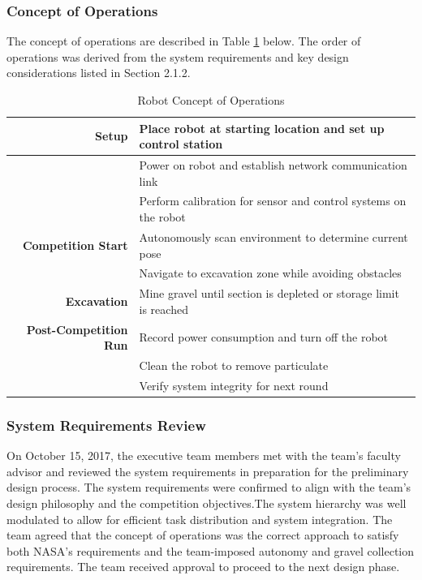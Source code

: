 \documentclass[class=article, crop=false]{standalone}
\begin{document}
	\subsubsection{Concept of Operations}
	The concept of operations are described in Table \ref{table:con_ops} below. The order of operations was derived from the system requirements and key design considerations listed in Section 2.1.2.
	
	\FloatBarrier
	\begin{table}[h]
	\centering
	\begin{tabular}{ | r | l |} 
 	\hline
 		\textbf{Setup}                & 
 		                                Place robot at starting location and set up control station \\ 
 		\hline
 		                              & Power on robot and establish network communication link \\
 		\hline
 		                              & Perform calibration for sensor and control systems on the robot \\
 		\hline\hline
 		\textbf{Competition Start}    & 
 		                                Autonomously scan environment to determine current pose \\
 		\hline
 		                              & Navigate to excavation zone while avoiding obstacles  \\
 		\hline\hline
 		\textbf{Excavation}           &
		                                Mine gravel until section is depleted or storage limit is reached \\
 		\hline\hline
 		\textbf{Post-Competition Run} &
 		                                Record power consumption and turn off the robot \\
 		\hline
 		                              & Clean the robot to remove particulate \\
 		\hline
 		                              & Verify system integrity for next round \\
 		\hline
	\end{tabular}
	\caption{Robot Concept of Operations}
		\label{table:con_ops}
	\end{table}
	\FloatBarrier
	
	\subsubsection{System Requirements Review}
	On October 15, 2017, the executive team members met with the team’s faculty advisor and reviewed the system requirements in preparation for the preliminary design process. The system requirements were confirmed to align with the team’s design philosophy and the competition objectives.The system hierarchy was well modulated to allow for efficient task distribution and system integration. The team agreed that the concept of operations was the correct approach to satisfy both NASA’s requirements and the team-imposed autonomy and gravel collection requirements. The team received approval to proceed to the next design phase.




	
\end{document}
